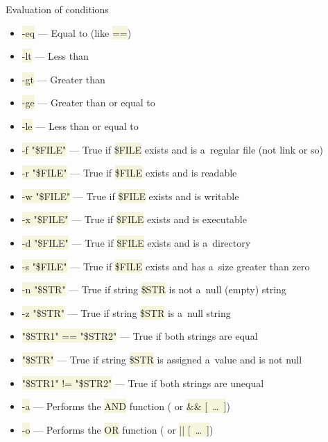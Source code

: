 \documentclass[compress, xelatex, 11pt, xcolor=svgnames, aspectratio=169,
	hyperref={
		bookmarks=true,
		unicode=true,
		colorlinks=true,
		pdftitle={Linux, command line and MetaCentrum},
		plainpages=false,
		pdfauthor={Vojtech Zeisek},
		pdfsubject={Course about use of Linux command line, writing shell scripts and using MetaCentrum of CESNET},
		pdfcreator={XeLaTeX},
		pdfkeywords={Linux, GNU, BASH, shell, command line, MetaCentrum},
		linkcolor=DarkRed, %
		anchorcolor=DarkBlue, %
		citecolor=Indigo, %
		filecolor=NavyBlue, %
		menucolor=DarkMagenta, %
		urlcolor=DarkBlue, %
		},
	url={hyphens, lowtilde} %
	]{beamer}
\renewcommand{\texttt}[1]{\colorbox{Beige}{{\ttfamily #1}}}
\begin{document}
\begin{frame}[allowframebreaks]{Evaluation of conditions}
\begin{itemize}
\begin{itemize}
			\item \texttt{-eq} --- Equal to (like \texttt{==})
			\item \texttt{-lt} --- Less than
			\item \texttt{-gt} --- Greater than
			\item \texttt{-ge} --- Greater than or equal to
			\item \texttt{-le} --- Less than or equal to
			\item \texttt{-f "\$\textbraceleft FILE\textbraceright "} --- True if \texttt{\$FILE} exists and is a~regular file (not link or so)
			\item \texttt{-r "\$\textbraceleft FILE\textbraceright "} --- True if \texttt{\$FILE} exists and is readable
			\item \texttt{-w "\$\textbraceleft FILE\textbraceright "} --- True if \texttt{\$FILE} exists and is writable
			\item \texttt{-x "\$\textbraceleft FILE\textbraceright "} --- True if \texttt{\$FILE} exists and is executable
			\item \texttt{-d "\$\textbraceleft FILE\textbraceright "} --- True if \texttt{\$FILE} exists and is a~directory
			\item \texttt{-s "\$\textbraceleft FILE\textbraceright "} --- True if \texttt{\$FILE} exists and has a~size greater than zero
			\item \texttt{-n "\$\textbraceleft STR\textbraceright "} --- True if string \texttt{\$STR} is not a~null (empty) string
			\item \texttt{-z "\$\textbraceleft STR\textbraceright "} --- True if string \texttt{\$STR} is a~null string
			\item \texttt{"\$\textbraceleft STR1\textbraceright " == "\$\textbraceleft STR2\textbraceright "} --- True if both strings are equal
			\item \texttt{"\$\textbraceleft STR\textbraceright "} --- True if string \texttt{\$STR} is assigned a~value and is not null
			\item \texttt{"\$\textbraceleft STR1\textbraceright " != "\$\textbraceleft STR2\textbraceright "} --- True if both strings are unequal
			\item \texttt{-a} --- Performs the \texttt{AND} function (\texttt{[~\ldots~-a~\ldots~]} or \texttt{[~\ldots~] \&\& [~\ldots~]})
			\item \texttt{-o} --- Performs the \texttt{OR} function (\texttt{[~\ldots~-o~\ldots~]} or \texttt{[~\ldots~] || [~\ldots~]})
		\end{itemize}

\end{itemize}
\end{frame}
\end{document}
